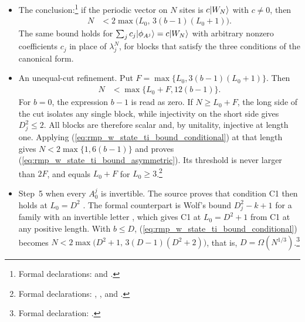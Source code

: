 \documentclass{article}
\begin{document}
\begin{itemize}
    \item The conclusion:\footnote{Formal declarations:
               and
              .}
          if the periodic vector on $N$ sites is $c|W_N\rangle$ with $c\neq0$, then
          \begin{align}
              N
               & <
              2\max\bigl(L_0,\,3(b-1)(L_0+1)\bigr).
              \label{eq:rmp_w_state_ti_bound_conditional}
          \end{align}
          The same bound holds for $\sum_jc_j|\phi_{A^j}\rangle=c|W_N\rangle$ with
          arbitrary nonzero coefficients $c_j$ in place of $\lambda_j^N$, for blocks
          that satisfy the three conditions of the canonical form.

    \item An unequal-cut refinement. Put $F=\max\{L_0,3(b-1)(L_0+1)\}$.
          Then
          \begin{align}
              N & <\max\{L_0+F,12(b-1)\}.
              \label{eq:rmp_w_state_ti_bound_asymmetric}
          \end{align}
          For $b=0$, the expression $b-1$ is read as zero. If $N\ge L_0+F$,
          the long side of the cut isolates any single block, while injectivity
          on the short side gives $D_j^2\le2$. All blocks are therefore scalar
          and, by unitality, injective at length one. Applying
          (\ref{eq:rmp_w_state_ti_bound_conditional}) at that length gives
          $N<2\max\{1,6(b-1)\}$ and proves
          (\ref{eq:rmp_w_state_ti_bound_asymmetric}). Its threshold is never larger
          than $2F$, and equals $L_0+F$ for $L_0\ge3$.\footnote{Formal declarations:
              ,
              , and
              .}

    \item Step~5 when every $A^j_0$ is invertible. The source proves that
          condition C1 then holds at $L_0=D^2$
          \cite[lines~2115--2118]{PerezGarcia2007MPSReps}. The formal counterpart
          is Wolf's bound $D_j^2-k+1$ for a family with an invertible
          letter \cite{Wolf2012Quantum}, which gives C1 at $L_0=D^2+1$ from C1 at
          any positive length. With $b\leq D$,
          (\ref{eq:rmp_w_state_ti_bound_conditional}) becomes
          $N<2\max\bigl(D^2+1,\,3(D-1)(D^2+2)\bigr)$, that is,
          $D=\Omega(N^{1/3})$.\footnote{Formal declaration:
              .}


\end{itemize}
\end{document}
